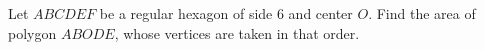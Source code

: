 Let $ABCDEF$ be a regular hexagon of side $6$ and center $O$. Find the area of polygon $ABODE$, whose vertices are taken in that order.
